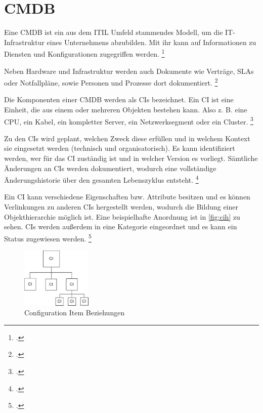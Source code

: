 \section{CMDB}
Eine \acf{CMDB} ist ein aus dem \acf{ITIL} Umfeld stammendes Modell, um die IT-Infrastruktur eines Unternehmens abzubilden. Mit ihr kann auf Informationen zu Diensten und Konfigurationen zugegriffen werden.
\footcite[Vgl.][70\psq]{Olbrich_2008_ITIL}

Neben Hardware und Infrastruktur werden auch Dokumente wie Verträge, \acfp{SLA} oder Notfallpläne, sowie  Personen und Prozesse dort dokumentiert.
\footcite[Vgl.][253]{Sturm_2017_CMDB}


Die Komponenten einer \acs{CMDB} werden als \acfp{CI} bezeichnet. Ein \acf{CI} ist eine Einheit, die aus einem oder mehreren Objekten bestehen kann. Also z. B. eine CPU, ein Kabel, ein kompletter Server, ein Netzwerksegment oder ein Cluster.
\footcite[Vgl.][70\psq]{Olbrich_2008_ITIL}

Zu den \acsp{CI} wird geplant, welchen Zweck diese erfüllen und in welchem Kontext sie eingesetzt werden (technisch und organisatorisch).
Es kann identifiziert werden, wer für das \acs{CI} zuständig ist und in welcher Version es vorliegt.
Sämtliche Änderungen an \acsp{CI} werden dokumentiert, wodurch eine vollständige Änderungshistorie über den gesamten Lebenszyklus entsteht.
\footcite[Vgl.][70\psq]{Olbrich_2008_ITIL}

Ein \acs{CI} kann verschiedene Eigenschaften bzw. Attribute besitzen und es können Verlinkungen zu anderen \acsp{CI} hergestellt werden, wodurch die Bildung einer Objekthierarchie möglich ist. Eine beispielhafte Anordnung ist in \autoref{fig:cih} zu sehen. \acsp{CI} werden außerdem in eine Kategorie eingeordnet und es kann ein Status zugewiesen werden.
\footcite[Vgl.][72\psqq]{Olbrich_2008_ITIL}

\begin{figure}[H]
  \centering
  \includegraphics[width=0.3\textwidth]{Anhang/cih}
  \caption{Configuration Item Beziehungen}
\label{fig:cih}
\end{figure}


